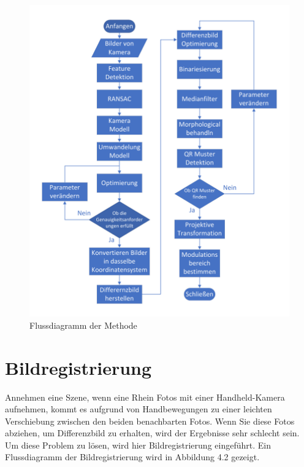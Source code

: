 \begin{figure}[H]
 \centering 
 \includegraphics[keepaspectratio,width=1.0\textwidth]{images/4_ZweiteErfahrung/Flussdiagrammsum.pdf}
 \caption{Flussdiagramm der Methode}
 \label{fig:Flussdiagramm der Methode}
\end{figure}

\section{Bildregistrierung} 

Annehmen eine Szene, wenn eine Rhein Fotos mit einer Handheld-Kamera aufnehmen, kommt es aufgrund von Handbewegungen zu einer leichten Verschiebung zwischen den beiden benachbarten Fotos. Wenn Sie diese Fotos abziehen, um Differenzbild zu erhalten, wird der Ergebnisse sehr schlecht sein. Um diese Problem zu lösen, wird hier Bildregistrierung eingeführt. Ein Flussdiagramm der Bildregistrierung wird in Abbildung 4.2 gezeigt. 

